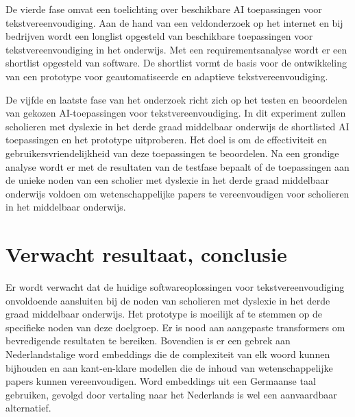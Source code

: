 De vierde fase omvat een toelichting over beschikbare AI toepassingen voor tekstvereenvoudiging. Aan de hand van een veldonderzoek op het internet en bij bedrijven wordt een longlist opgesteld van beschikbare toepassingen voor tekstvereenvoudiging in het onderwijs. Met een requirementsanalyse wordt er een shortlist opgesteld van software. De shortlist vormt de basis voor de ontwikkeling van een prototype voor geautomatiseerde en adaptieve tekstvereenvoudiging.

De vijfde en laatste fase van het onderzoek richt zich op het testen en beoordelen van gekozen AI-toepassingen voor tekstvereenvoudiging. In dit experiment zullen scholieren met dyslexie in het derde graad middelbaar onderwijs de shortlisted AI toepassingen en het prototype uitproberen. Het doel is om de effectiviteit en gebruikersvriendelijkheid van deze toepassingen te beoordelen. Na een grondige analyse wordt er met de resultaten van de testfase bepaalt of de toepassingen aan de unieke noden van een scholier met dyslexie in het derde graad middelbaar onderwijs voldoen om wetenschappelijke papers te vereenvoudigen voor scholieren in het middelbaar onderwijs.

\section{Verwacht resultaat, conclusie}
\label{sec:verwachte_resultaten}


Er wordt verwacht dat de huidige softwareoplossingen voor tekstvereenvoudiging onvoldoende aansluiten bij de noden van scholieren met dyslexie in het derde graad middelbaar onderwijs. Het prototype is moeilijk af te stemmen op de specifieke noden van deze doelgroep. Er is nood aan aangepaste transformers om bevredigende resultaten te bereiken. Bovendien is er een gebrek aan Nederlandstalige word embeddings die de complexiteit van elk woord kunnen bijhouden en aan kant-en-klare modellen die de inhoud van wetenschappelijke papers kunnen vereenvoudigen. Word embeddings uit een Germaanse taal gebruiken, gevolgd door vertaling naar het Nederlands is wel een aanvaardbaar alternatief. 


